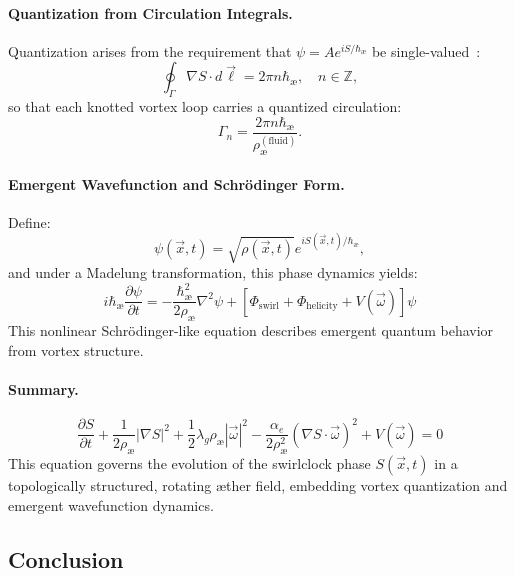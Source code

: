 \paragraph{Quantization from Circulation Integrals.}
Quantization arises from the requirement that \( \psi = A e^{i S/\hbar_\text{\ae}} \) be single-valued~\cite{helmholtz1858integrals,faddeev1997stable}:
\begin{equation}
\oint_\Gamma \nabla S \cdot d\vec{\ell} = 2\pi n \hbar_\text{\ae}, \quad n \in \mathbb{Z},
\end{equation}
so that each knotted vortex loop carries a quantized circulation:
\begin{equation}
\Gamma_n = \frac{2\pi n \hbar_\text{\ae}}{\rho_\text{\ae}^{(\text{fluid})}}.
\end{equation}

\paragraph{Emergent Wavefunction and Schrödinger Form.}
Define:
\begin{equation}
\psi(\vec{x}, t) = \sqrt{\rho(\vec{x}, t)} e^{i S(\vec{x}, t)/\hbar_\text{\ae}},
\end{equation}
and under a Madelung transformation, this phase dynamics yields:
\begin{equation}
\boxed{
i \hbar_\text{\ae} \frac{\partial \psi}{\partial t} = -\frac{\hbar_\text{\ae}^2}{2 \rho_\text{\ae}} \nabla^2 \psi + \left[\Phi_\text{swirl} + \Phi_\text{helicity} + V(\vec{\omega})\right] \psi
}
\end{equation}
This nonlinear Schrödinger-like equation describes emergent quantum behavior from vortex structure.

\paragraph{Summary.}
\begin{equation}
\boxed{
\frac{\partial S}{\partial t} + \frac{1}{2 \rho_\text{\ae}} |\nabla S|^2 + \frac{1}{2} \lambda_g \rho_\text{\ae} |\vec{\omega}|^2 - \frac{\alpha_e}{2 \rho_\text{\ae}^2} (\nabla S \cdot \vec{\omega})^2 + V(\vec{\omega}) = 0
}
\end{equation}
This equation governs the evolution of the swirlclock phase \( S(\vec{x}, t) \) in a topologically structured, rotating \ae ther field, embedding vortex quantization and emergent wavefunction dynamics.

\subsection*{Conclusion}

